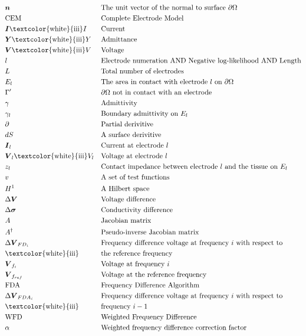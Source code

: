 \pagebreak
\begin{align*}
	&\boldsymbol{n} &&\text{The unit vector of the normal to surface } \partial \Omega \\
	&\text{CEM} &&\text{Complete Electrode Model}\\
	&\boldsymbol{I} \text{\textcolor{white}{iii}} I &&\text{Current}\\
	&\boldsymbol{Y} \text{\textcolor{white}{iii}} Y &&\text{Admittance}\\
	&\boldsymbol{V} \text{\textcolor{white}{iii}} V &&\text{Voltage}\\
	&l &&\text{Electrode numeration AND Negative log-likelihood AND Length}\\
	&L &&\text{Total number of electrodes}\\
	&E_l &&\text{The area in contact with electrode } l \text{ on } \partial \Omega \\
	&\Gamma ' &&\partial \Omega \text{ not in contact with an electrode}\\
	&\gamma && \text{Admittivity}\\
	&\gamma_l && \text{Boundary admittivity on } E_l \\
	&\partial && \text{Partial derivitive}\\
	&dS &&\text{A surface derivitive}\\
	&\boldsymbol{I}_l &&\text{Current at electrode } l \\
	&\boldsymbol{V}_l \text{\textcolor{white}{iii}} V_l &&\text{Voltage at electrode } l \\
	&z_l &&\text{Contact impedance between electrode } l \text{ and the tissue on } E_l \\
	&v &&\text{A set of test functions}\\
	&H^1 &&\text{A Hilbert space}\\
	&\Delta \boldsymbol{V} &&\text{Voltage difference}\\
	&\Delta \boldsymbol{\sigma} &&\text{Conductivity difference}\\
	&A &&\text{Jacobian matrix}\\
	&A^{\dagger} &&\text{Pseudo-inverse Jacobian matrix}\\
	&\Delta \boldsymbol{V}_{FD_i} &&\text{Frequency difference voltage at frequency } i \text{ with respect to}\\
	&\text{\textcolor{white}{iii}} &&\text{the reference frequency}\\
	&\boldsymbol{V}_{f_i} &&\text{Voltage at frequency } i \\
	&\boldsymbol{V}_{f_{ref}} &&\text{Voltage at the reference frequency}\\
	&\text{FDA} &&\text{Frequency Difference Algorithm}\\
	&\Delta \boldsymbol{V}_{FDA_i} &&\text{Frequency difference voltage at frequency } i \text{ with respect to}\\
	&\text{\textcolor{white}{iii}} &&\text{frequency } i - 1 \\
	&\text{WFD} &&\text{Weighted Frequency Difference}\\
	&\alpha &&\text{Weighted frequency difference correction factor}\\
\end{align*}

